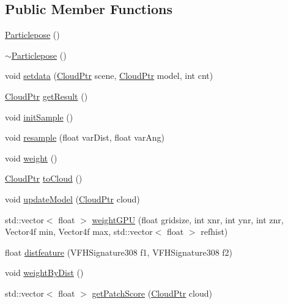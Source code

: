 \subsection*{\-Public \-Member \-Functions}
\begin{DoxyCompactItemize}
\item 
\hyperlink{class_particlepose_ad0812c3c3ae574cd927f25980d63262c}{\-Particlepose} ()
\item 
\hyperlink{class_particlepose_a3a6c9be74fe45665ba536de53a91d268}{$\sim$\-Particlepose} ()
\item 
void \hyperlink{class_particlepose_ad32cef58fb6f06fc41332170241ad132}{setdata} (\hyperlink{common_8h_a36884aa4a3c181fa4c284d79329ad166}{\-Cloud\-Ptr} scene, \hyperlink{common_8h_a36884aa4a3c181fa4c284d79329ad166}{\-Cloud\-Ptr} model, int cnt)
\item 
\hyperlink{common_8h_a36884aa4a3c181fa4c284d79329ad166}{\-Cloud\-Ptr} \hyperlink{class_particlepose_ad3ff7daa451218d902b0bffcf5c4e5bc}{get\-Result} ()
\item 
void \hyperlink{class_particlepose_ab579314deee0989210524ac33a0507e5}{init\-Sample} ()
\item 
void \hyperlink{class_particlepose_af5322a5db6b412a5a057c687511424ef}{resample} (float var\-Dist, float var\-Ang)
\item 
void \hyperlink{class_particlepose_a5969de8804b86d863d03eaf2b2f24480}{weight} ()
\item 
\hyperlink{common_8h_a36884aa4a3c181fa4c284d79329ad166}{\-Cloud\-Ptr} \hyperlink{class_particlepose_a719e82e44ddb312a54f6728afa6300ec}{to\-Cloud} ()
\item 
void \hyperlink{class_particlepose_a58a07a0b87e10acbf73de973e8dd9618}{update\-Model} (\hyperlink{common_8h_a36884aa4a3c181fa4c284d79329ad166}{\-Cloud\-Ptr} cloud)
\item 
std\-::vector$<$ float $>$ \hyperlink{class_particlepose_a2dfff2c77bd7367a0413cbb463c2986a}{weight\-G\-P\-U} (float gridsize, int xnr, int ynr, int znr, \-Vector4f min, \-Vector4f max, std\-::vector$<$ float $>$ refhist)
\item 
float \hyperlink{class_particlepose_a37277d19b404d2dc338f56ff98049868}{distfeature} (\-V\-F\-H\-Signature308 f1, \-V\-F\-H\-Signature308 f2)
\item 
void \hyperlink{class_particlepose_af53e0c58df04f1cc6edaea13f6530d05}{weight\-By\-Dist} ()
\item 
std\-::vector$<$ float $>$ \hyperlink{class_particlepose_ad42796cd810c3d078604c8a286fe90bd}{get\-Patch\-Score} (\hyperlink{common_8h_a36884aa4a3c181fa4c284d79329ad166}{\-Cloud\-Ptr} cloud)
\end{DoxyCompactItemize}
